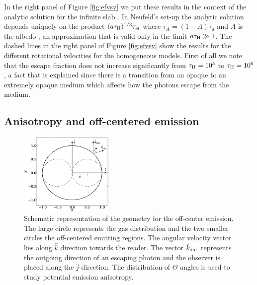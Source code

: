 \documentclass{emulateapj}
\newcommand{\ly}{{\ifmmode{{\rm Ly}\alpha~}\else{Ly$\alpha$~}\fi}}
\begin{document}
In the right panel of Figure \ref{fig:efvsv} we put these results in the context of
the analytic solution for the infinite slab \citep{Neufeld90}. In
Neufeld's set-up the analytic solution depends uniquely on the product
$(a\tau_{\rm   H})^{1/3}\tau_{A}$ where $\tau_{A} = (1 - A)\tau_{a}$ and $A$ is the albedo
, an approximation that is valid only
in the limit $a\tau_{\rm   H}\gg 1$. The dashed lines in the right panel of Figure
\ref{fig:efvsv} show the results for the different rotational
velocities for the homogeneous models. First of all we note that the escape fraction does not
increase significantly from $\tau_{\rm H}=10^{5}$ to $\tau_{\rm H}=10^{6}$, a fact
that is explained since there is a transition from an opaque to an extremely opaque medium
which affects how the \ly photons escape from the medium.

\subsection{Anisotropy and off-centered emission}
\label{sec:off-center}

\begin{figure}
\begin{center}
  \includegraphics[width=0.40\textwidth]{f8.eps}
\end{center}
\caption{Schematic representation of the geometry for the off-center
  emission. The large circle represents the gas distribution and the
    two smaller circles the off-centered \ly emitting regions. The angular
    velocity vector lies along $\hat{k}$ direction
    towards the reader. The vector $\hat{k}_{\rm out}$ represents the
    outgoing direction of an escaping \ly photon and the observer is
    placed along the $\hat{j}$ direction. The distribution of $\Theta$
    angles is used to study potential emission anisotropy. 
    \label{fig:OCspheres}}
\end{figure}
\end{document}
